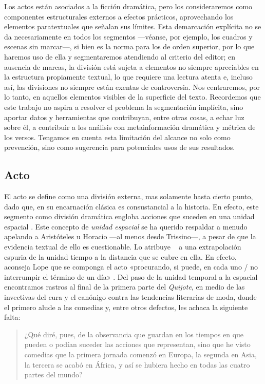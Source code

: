 Los actos están asociados a la ficción dramática, pero los consideraremos como componentes estructurales externos a efectos prácticos, aprovechando los elementos paratextuales que señalan sus límites. Esta demarcación explícita no se da necesariamente en todos los segmentos —\nolinebreak véanse, por ejemplo, los cuadros y escenas sin marcar\nolinebreak—\nolinebreak, si bien es la norma para los de orden superior, por lo que haremos uso de ella y segmentaremos atendiendo al criterio del editor; en ausencia de marcas, la división está sujeta a elementos no siempre apreciables en la estructura propiamente textual, lo que requiere una lectura atenta e, incluso así, las divisiones no siempre están exentas de controversia. Nos centraremos, por lo tanto, en aquellos elementos visibles de la superficie del texto. Recordemos que este trabajo no aspira a resolver el problema la segmentación implícita, sino aportar datos y herramientas que contribuyan, entre otras cosas, a echar luz sobre él, a contribuir a los análisis con metainformación dramática y métrica de los versos. Tengamos en cuenta esta limitación del alcance no solo como prevención, sino como sugerencia para potenciales usos de sus resultados.

\subsection{Acto}

El acto se define como una división externa, mas solamente hasta cierto punto, dado que, en su encarnación clásica es consustancial a la historia. En efecto, este segmento como división dramática engloba acciones que suceden en una unidad espacial \parencite[170]{kayser1992}. Este concepto de \textit{unidad espacial} se ha querido respaldar a menudo apelando a Aristóteles u Horacio —\nolinebreak al menos desde Trissino\nolinebreak—\nolinebreak, a pesar de que la evidencia textual de ello es cuestionable. Lo atribuye \citeauthor{corneille1862}~\parencite*[117]{corneille1862} a una extrapolación espuria de la unidad tiempo a la distancia que se cubre en ella. En efecto, aconseja Lope que se componga el acto «procurando, si puede, en cada uno / no interrumpir el término de un día»  \parencite[213-114]{vega2006}. Del paso de la unidad temporal a la espacial encontramos rastros al final de la primera parte del \textit{Quijote}, en medio de las invectivas del cura y el canónigo contra las tendencias literarias de moda, donde el primero alude a las comedias y, entre otros defectos, les achaca la siguiente falta:
\blockquote{¿Qué diré, pues, de la observancia que guardan en los tiempos en que pueden o podían suceder las acciones que representan, sino que he visto comedias que la primera jornada comenzó en Europa, la segunda en Asia, la tercera se acabó en África, y así se hubiera hecho en todas las cuatro partes del mundo? \parencite[624]{cervantes2016c}}

